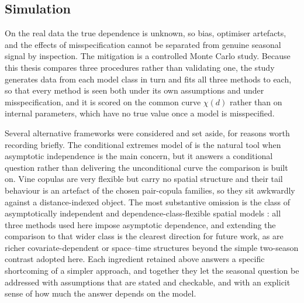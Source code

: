 \subsection{Simulation}\label{sec:lit-simulation}\label{sec:lit-seasonal}

On the real data the true dependence is unknown, so bias, optimiser artefacts, and the effects of misspecification cannot be separated from genuine seasonal signal by inspection. The mitigation is a controlled Monte Carlo study. Because this thesis compares three procedures rather than validating one, the study generates data from each model class in turn and fits all three methods to each, so that every method is seen both under its own assumptions and under misspecification, and it is scored on the common curve \(\chi(d)\) rather than on internal parameters, which have no true value once a model is misspecified.

Several alternative frameworks were considered and set aside, for reasons worth recording briefly. The conditional extremes model of \citet{heffernan2004} is the natural tool when asymptotic independence is the main concern, but it answers a conditional question rather than delivering the unconditional curve the comparison is built on. Vine copulas \citep{aas2009} are very flexible but carry no spatial structure and their tail behaviour is an artefact of the chosen pair-copula families, so they sit awkwardly against a distance-indexed object. The most substantive omission is the class of asymptotically independent and dependence-class-flexible spatial models \citep{huseropitzthibaud2017,huserwadsworth2019,huserwadsworth2022}: all three methods used here impose asymptotic dependence, and extending the comparison to that wider class is the clearest direction for future work, as are richer covariate-dependent or space--time structures \citep{buhl2016} beyond the simple two-season contrast adopted here. Each ingredient retained above answers a specific shortcoming of a simpler approach, and together they let the seasonal question be addressed with assumptions that are stated and checkable, and with an explicit sense of how much the answer depends on the model.